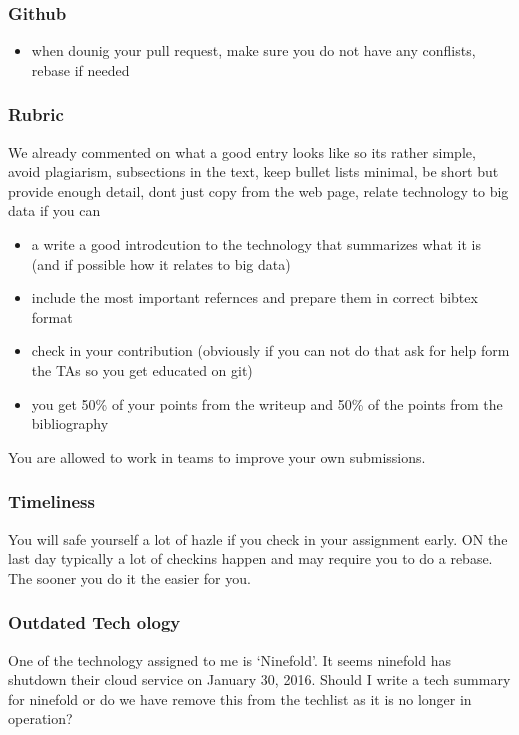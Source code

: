 \subsubsection{Github}
\label{\detokenize{faq:github}}\begin{itemize}
\item {} 
when dounig your pull request, make sure you do not have any conflists, rebase if needed

\end{itemize}


\subsubsection{Rubric}
\label{\detokenize{faq:rubric}}
We already commented on what a good entry looks like so its rather
simple, avoid plagiarism, subsections in the text, keep bullet lists
minimal, be short but provide enough detail, dont just copy from the
web page, relate technology to big data if you can
\begin{itemize}
\item {} 
a write a good introdcution to the technology that summarizes what
it is (and if possible how it relates to big data)

\item {} 
include the most important refernces and prepare them in correct
bibtex format

\item {} 
check in your contribution (obviously if you can not do that ask for
help form the TAs so you get educated on git)

\item {} 
you get 50\% of your points from the writeup and 50\% of the points
from the bibliography

\end{itemize}

You are allowed to work in teams to improve your own submissions.


\subsubsection{Timeliness}
\label{\detokenize{faq:timeliness}}
You will safe yourself a lot of hazle if you check in your assignment
early.  ON the last day typically a lot of checkins happen and may
require you to do a rebase. The sooner you do it the easier for you.


\subsubsection{Outdated Tech ology}
\label{\detokenize{faq:outdated-tech-ology}}
One of the technology assigned to me is `Ninefold'. It seems ninefold
has shutdown their cloud service on January 30, 2016. Should I write a
tech summary for ninefold or do we have remove this from the techlist
as it is no longer in operation?

